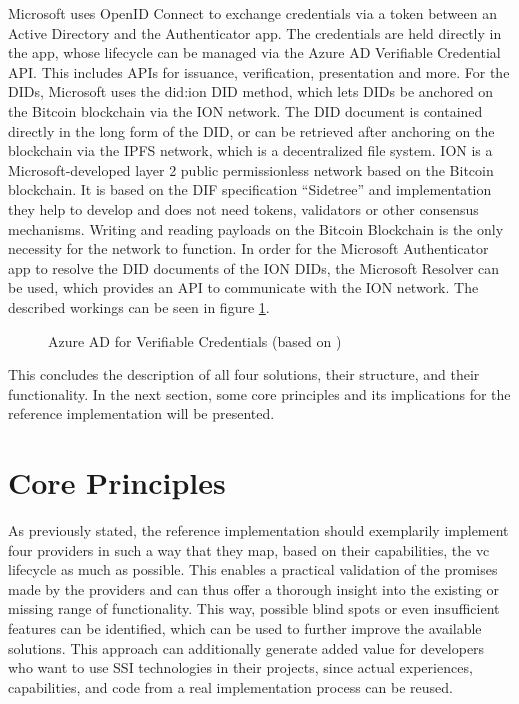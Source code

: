     Microsoft uses OpenID Connect to exchange credentials via a token between an Active Directory and the Authenticator app. The credentials are held directly in the app, whose lifecycle can be managed via the Azure AD Verifiable Credential API. This includes APIs for issuance, verification, presentation and more. For the \acp{DID}, Microsoft uses the did:ion \ac{DID} method, which lets \acp{DID} be anchored on the Bitcoin blockchain via the ION network. The \ac{DID} document is contained directly in the long form of the \ac{DID}, or can be retrieved after anchoring on the blockchain via the IPFS network, which is a decentralized file system. ION is a Microsoft-developed layer 2 public permissionless network based on the Bitcoin blockchain. It is based on the DIF specification “Sidetree” and implementation they help to develop and does not need tokens, validators or other consensus mechanisms. Writing and reading payloads on the Bitcoin Blockchain is the only necessity for the network to function. In order for the Microsoft Authenticator app to resolve the \ac{DID} documents of the ION \acp{DID}, the Microsoft Resolver can be used, which provides an API to communicate with the ION network. The described workings can be seen in figure \ref{figure: azure ad}. \cite{neira_introduction_2021}
    
    \begin{figure}[ht]
	    \centering    	   
	    \makebox[\textwidth]{}
        \caption{Azure AD for Verifiable Credentials (based on \cite{neira_introduction_2021})}
        \label{figure: azure ad}
    \end{figure}
    
    This concludes the description of all four solutions, their structure, and their functionality. In the next section, some core principles and its implications for the reference implementation will be presented.
    \newpage

	\section{Core Principles}\label{section: core principles}
	
	As previously stated, the reference implementation should exemplarily implement four providers in such a way that they map, based on their capabilities, the \ac{vc} lifecycle as much as possible. This enables a practical validation of the promises made by the providers and can thus offer a thorough insight into the existing or missing range of functionality. This way, possible blind spots or even insufficient features can be identified, which can be used to further improve the available solutions. This approach can additionally generate added value for developers who want to use \ac{SSI} technologies in their projects, since actual experiences, capabilities, and code from a real implementation process can be reused.
    
